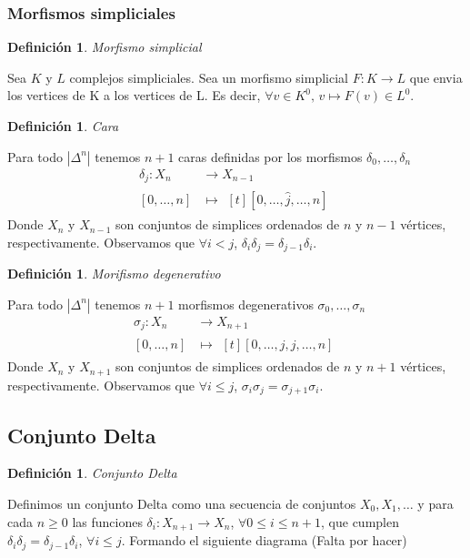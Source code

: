 \documentclass[11pt,a4paper,openright,oneside]{article}
\numberwithin{equation}{section}
\newtheorem{defi}[teo]{Definici\'on}
\theoremstyle{definition}
\begin{document}
\subsubsection{Morfismos simpliciales}
\begin{defi}
    Morfismo simplicial
\end{defi}
Sea $K$ y $L$ complejos simpliciales. Sea un morfismo simplicial $F: K \longrightarrow L$ que envia los vertices de K a los vertices de L. Es decir, $\forall v \in K^0 \text{, } v \longmapsto F(v) \in L^0$.

\begin{defi}
    Cara
\end{defi}
Para todo $|\Delta^n|$ tenemos $n+1$ caras definidas por los morfismos $\delta_0,\dots,\delta_n$
\begin{align*}
    \delta_j: X_n & \longrightarrow X_{n-1} \\
    [0,\dots,n]   & \longmapsto\!
    \begin{aligned}[t]
        [0,\dots,\hat{j},\dots,n]
    \end{aligned}
\end{align*}
Donde $X_n$ y $X_{n-1}$ son conjuntos de simplices ordenados de $n$ y $n-1$ v\'ertices, respectivamente. Observamos que $\forall i<j$, $\delta_i\delta_j = \delta_{j-1}\delta_{i}$.

\begin{defi}
    Morifismo degenerativo
\end{defi}
Para todo $|\Delta^n|$ tenemos $n+1$ morfismos degenerativos $\sigma_0,\dots,\sigma_n$
\begin{align*}
    \sigma_j: X_n & \longrightarrow X_{n+1} \\
    [0,\dots,n]   & \longmapsto\!
    \begin{aligned}[t]
        [0,\dots,j,j,\dots,n]
    \end{aligned}
\end{align*}
Donde $X_n$ y $X_{n+1}$ son conjuntos de simplices ordenados de $n$ y $n+1$ v\'ertices, respectivamente. Observamos que $\forall i\le j$, $\sigma_i\sigma_j = \sigma_{j+1}\sigma_{i}$.

\subsection{Conjunto Delta}
\begin{defi}
    Conjunto Delta
\end{defi}
Definimos un conjunto Delta como una secuencia de conjuntos $X_0,X_1,\dots$ y para cada $n\ge 0$ las funciones $\delta_i: X_{n+1} \longrightarrow X_n$, $\forall 0\le i \le n+1$, que cumplen $\delta_i\delta_j = \delta_{j-1}\delta_{i}$, $\forall i\le j$.
Formando el siguiente diagrama (Falta por hacer)
\end{document}
